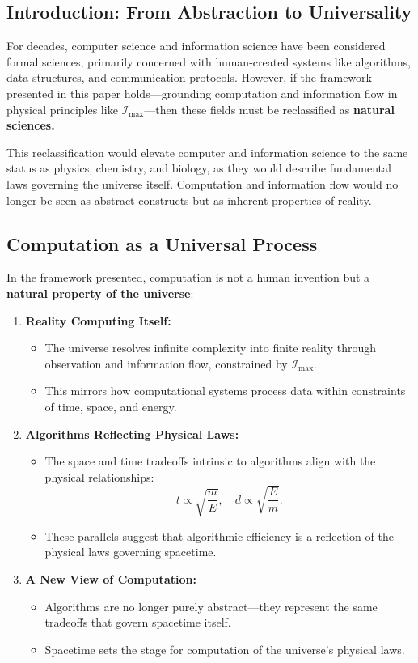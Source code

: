 \documentclass[12pt]{article}
\begin{document}
\subsection{Introduction: From Abstraction to Universality}

For decades, computer science and information science have been considered formal sciences, primarily concerned with human-created systems like algorithms, data structures, and communication protocols. However, if the framework presented in this paper holds—grounding computation and information flow in physical principles like $\mathcal{I}_{\text{max}}$—then these fields must be reclassified as \textbf{natural sciences.}

This reclassification would elevate computer and information science to the same status as physics, chemistry, and biology, as they would describe fundamental laws governing the universe itself. Computation and information flow would no longer be seen as abstract constructs but as inherent properties of reality.

\subsection{Computation as a Universal Process}

In the framework presented, computation is not a human invention but a \textbf{natural property of the universe}:
\begin{enumerate}
    \item \textbf{Reality Computing Itself:}
    \begin{itemize}
        \item The universe resolves infinite complexity into finite reality through observation and information flow, constrained by $\mathcal{I}_{\text{max}}$.
        \item This mirrors how computational systems process data within constraints of time, space, and energy.
    \end{itemize}

    \item \textbf{Algorithms Reflecting Physical Laws:}
    \begin{itemize}
        \item The space and time tradeoffs intrinsic to algorithms align with the physical relationships:
        \[
        t \propto \sqrt{\frac{m}{E}}, \quad d \propto \sqrt{\frac{E}{m}}.
        \]
        \item These parallels suggest that algorithmic efficiency is a reflection of the physical laws governing spacetime.
    \end{itemize}

    \item \textbf{A New View of Computation:}
    \begin{itemize}
        \item Algorithms are no longer purely abstract—they represent the same tradeoffs that govern spacetime itself.
        \item Spacetime sets the stage for computation of the universe's physical laws.
    \end{itemize}
\end{enumerate}
\end{document}
